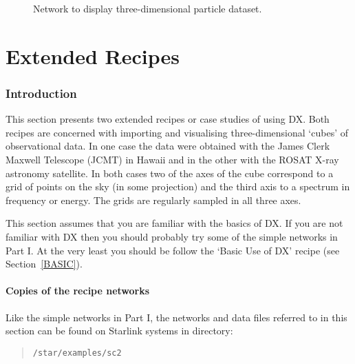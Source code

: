 \documentclass[twoside,11pt]{article}
\newcommand{\stardocinitials}  {SC}
\newcommand{\stardocnumber}    {2.3}
\newcommand{\stardocname}{\stardocinitials /\stardocnumber}
\newcommand{\xlabel}[1]{}
\begin{document}
\begin{figure}[htbp]

\begin{center}
\leavevmode
\epsfxsize=271pt
\end{center}

\caption[Network to display three-dimensional particle dataset.]{Network
to display three-dimensional particle dataset. \label{PARTNETF} }

\end{figure}


\cleardoublepage
\markboth{\stardocname}{\stardocname}
\part{Extended Recipes}
\markboth{\stardocname}{\stardocname}
\section{\xlabel{INTRO_EXTEND}Introduction}

This section presents two extended recipes or case studies of using
DX.  Both recipes are concerned with importing and visualising
three-dimensional `cubes' of observational data.  In one case the data
were obtained with the James Clerk Maxwell Telescope (JCMT) in Hawaii
and in the other with the ROSAT X-ray astronomy satellite.  In both
cases two of the axes of the cube correspond to a grid of points on
the sky (in some projection) and the third axis to a spectrum in
frequency or energy.  The grids are regularly sampled in all three axes.

This section assumes that you are familiar with the basics of DX.  If
you are not familiar with DX then you should probably try some of
the simple networks in Part I.  At the very least you should be
follow the `Basic Use of DX' recipe (see Section~\ref{BASIC}).

\subsection{Copies of the recipe networks}

Like the simple networks in Part I, the networks and data files referred
to in this section can be found on Starlink systems in directory:

\begin{quote}
{\tt /star/examples/sc2}
\end{quote}
\end{document}
